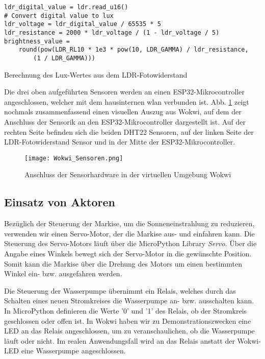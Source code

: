 \begin{listing}[!ht]
\begin{verbatim}
ldr_digital_value = ldr.read_u16()
# Convert digital value to lux
ldr_voltage = ldr_digital_value / 65535 * 5
ldr_resistance = 2000 * ldr_voltage / (1 - ldr_voltage / 5)
brightness_value = 
    round(pow(LDR_RL10 * 1e3 * pow(10, LDR_GAMMA) / ldr_resistance, 
        (1 / LDR_GAMMA)))
\end{verbatim}
\caption{Berechnung des Lux-Wertes aus dem LDR-Fotowiderstand}
\label{list:LDR_Berechnung}
\end{listing}

Die drei oben aufgeführten Sensoren werden an einen ESP32-Mikrocontroller angeschlossen, welcher mit dem hausinternen \gls{wlan} verbunden ist. Abb. \ref{fig:wokwi_sensoren} zeigt nochmals zusammenfassend einen visuellen Auszug aus Wokwi, auf dem der Anschluss der Sensorik an den ESP32-Mikrocontroller dargestellt ist. Auf der rechten Seite befinden sich die beiden DHT22 Sensoren, auf der linken Seite der LDR-Fotowiderstand Sensor und in der Mitte der ESP32-Mikrocontroller.

\begin{figure}[h]
    \centering
    \texttt{[image: Wokwi\_Sensoren.png]}
    \caption{Anschluss der Sensorhardware in der virtuellen Umgebung Wokwi}\label{fig:wokwi_sensoren}
\end{figure}

\subsection{Einsatz von Aktoren}
Bezüglich der Steuerung der Markise, um die Sonneneinstrahlung zu reduzieren, verwenden wir einen Servo-Motor, der die Markise aus- und einfahren kann. Die Steuerung des Servo-Motors läuft über die MicroPython Library \textit{Servo}. Über die Angabe eines Winkels bewegt sich der Servo-Motor in die gewünschte Position. Somit kann die Markise über die Drehung des Motors um einen bestimmten Winkel ein- bzw. ausgefahren werden.

Die Steuerung der Wasserpumpe übernimmt ein Relais, welches durch das Schalten eines neuen Stromkreises die Wasserpumpe an- bzw. ausschalten kann. In MicroPython definieren die Werte '0' und '1' des Relais, ob der Stromkreis geschlossen oder offen ist. In Wokwi haben wir zu Demonstrationszwecken eine LED an das Relais angeschlossen, um zu veranschaulichen, ob die Wasserpumpe läuft oder nicht. Im realen Anwendungsfall wird an das Relais anstatt der Wokwi-LED eine Wasserpumpe angeschlossen.

